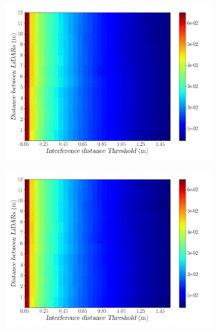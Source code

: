 \begin{figure}[!ht]
\centering
\begin{subfigure}[c]{0.45\textwidth}
	\includegraphics[width=\textwidth]{img/lidar-interference/distance/interference_distance_color_mesh.png}
\caption{}%
	\label{fig:distance:interference-color-mesh}
\end{subfigure}
\qquad
\begin{subfigure}[c]{0.45\textwidth}
	\includegraphics[width=\textwidth]{img/lidar-interference/distance/ground_truth_distance_color_mesh.png}
\caption{}%

\end{subfigure}
\end{figure}
